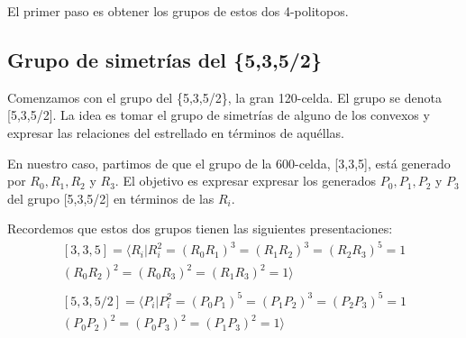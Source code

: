 \documentclass[spanish]{article}
\theoremstyle{definition}
\begin{document}
El primer paso es obtener los grupos de estos dos 4-politopos.
	
\subsection{Grupo de simetrías del \{5,3,5/2\}}
Comenzamos con el grupo del \{5,3,5/2\}, la gran 120-celda. El grupo se denota [5,3,5/2]. La idea es tomar el grupo de simetrías de alguno de los convexos y expresar las relaciones del estrellado en términos de aquéllas.

En nuestro caso, partimos de que el grupo de la 600-celda, [3,3,5], está generado por $R_0,R_1,R_2$ y $R_3$. El objetivo es expresar expresar los generados $P_0,P_1,P_2$ y $P_3$ del grupo [5,3,5/2] en términos de las $R_i$.

Recordemos que estos dos grupos tienen las siguientes presentaciones:
\begin{align*}\label{rels}
	[3,3,5]=\langle R_i|R_i^2=(R_0R_1)^3=(R_1R_2)^3=(R_2R_3)^5=1\\
	(R_0R_2)^2=(R_0R_3)^2=(R_1R_3)^2=1\rangle\\ \\
	[5,3,5/2]=\langle P_i|P_i^2=(P_0P_1)^5=(P_1P_2)^3=(P_2P_3)^5=1\\
	(P_0P_2)^2=(P_0P_3)^2=(P_1P_3)^2=1\rangle
\end{align*}
\end{document}
